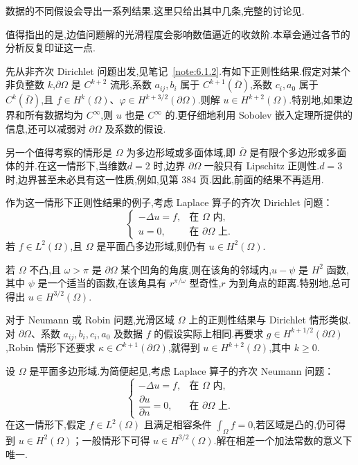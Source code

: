 数据的不同假设会导出一系列结果.这里只给出其中几条,完整的讨论见.

值得指出的是,边值问题解的光滑程度会影响数值逼近的收敛阶.本章会通过各节的分析反复印证这一点.

先从非齐次 Dirichlet 问题出发,见笔记~\ref{note:6.1.2}.有如下正则性结果.假定对某个非负整数 \(k\),\(\partial\Omega\) 是 \(C^{k+2}\) 流形,系数 \(a_{ij},b_i\) 属于 \(C^{k+1}(\overline\Omega)\),系数 \(c_i,a_0\) 属于 \(C^k(\overline\Omega)\),且 \(f\in H^k(\Omega)\)、\(\varphi\in H^{k+3/2}(\partial\Omega)\).则解 \(u\in H^{k+2}(\Omega)\).特别地,如果边界和所有数据均为 \(C^\infty\),则 \(u\) 也是 \(C^\infty\) 的.更仔细地利用 Sobolev 嵌入定理所提供的信息,还可以减弱对 \(\partial\Omega\) 及系数的假设.

另一个值得考察的情形是 \(\Omega\) 为多边形域或多面体域,即 \(\overline\Omega\) 是有限个多边形或多面体的并.在这一情形下,当维数\(d=2\) 时,边界 \(\partial\Omega\) 一般只有 Lipschitz 正则性.\(d=3\) 时,边界甚至未必具有这一性质,例如,见第 384 页.因此,前面的结果不再适用.

作为这一情形下正则性结果的例子,考虑 Laplace 算子的齐次 Dirichlet 问题：
\begin{equation}\label{eq:6.1.28}
  \begin{cases}
    -\Delta u=f,&\text{在 }\Omega\text{ 内},\\
    u=0,&\text{在 }\partial\Omega\text{ 上}.
  \end{cases}
\end{equation}
若 \(f\in L^2(\Omega)\),且 \(\Omega\) 是平面凸多边形域,则仍有 \(u\in H^2(\Omega)\).

若 \(\Omega\) 不凸,且 \(\omega>\pi\) 是 \(\partial\Omega\) 某个凹角的角度,则在该角的邻域内,\(u-\psi\) 是 \(H^2\) 函数,其中 \(\psi\) 是一个适当的函数,在该角具有 \(r^{\pi/\omega}\) 型奇性,\(r\) 为到角点的距离.特别地,总可得出 \(u\in H^{3/2}(\Omega)\).

对于 Neumann 或 Robin 问题,光滑区域 \(\Omega\) 上的正则性结果与 Dirichlet 情形类似.对 \(\partial\Omega\)、系数 \(a_{ij},b_i,c_i,a_0\) 及数据 \(f\) 的假设实际上相同.再要求 \(g\in H^{k+1/2}(\partial\Omega)\),Robin 情形下还要求 \(\kappa\in C^{k+1}(\partial\Omega)\),就得到 \(u\in H^{k+2}(\Omega)\),其中 \(k\ge0\).

设 \(\Omega\) 是平面多边形域.为简便起见,考虑 Laplace 算子的齐次 Neumann 问题：
\begin{equation}\label{eq:6.1.29}
  \begin{cases}
    -\Delta u=f,&\text{在 }\Omega\text{ 内},\\
    \dfrac{\partial u}{\partial n}=0,&\text{在 }\partial\Omega\text{ 上}.
  \end{cases}
\end{equation}
在这一情形下,假定 \(f\in L^2(\Omega)\) 且满足相容条件 \(\int_\Omega f=0\),若区域是凸的,仍可得到 \(u\in H^2(\Omega)\)；一般情形下可得 \(u\in H^{3/2}(\Omega)\).解在相差一个加法常数的意义下唯一.

